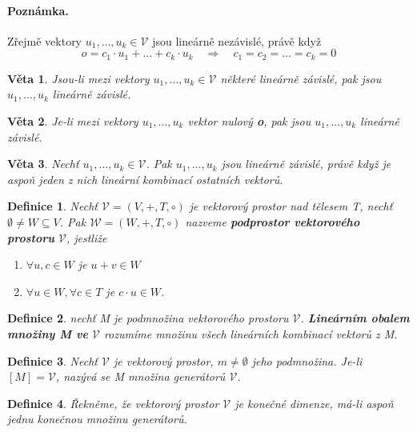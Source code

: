 \documentclass[12pt,a4paper]{article}
\newtheorem{definition}{Definice}
\newtheorem{sentence}{Věta}
\begin{document}
\paragraph{Poznámka.} Zřejmě vektory  $u_1, \dots, u_k \in \mathscr{V}$ jsou lineárně nezávislé, právě když $$o = c_1 \cdot u_1 +  \dots + c_k \cdot u_k \quad \Rightarrow \quad c_1 = c_2 = \dots = c_k = 0$$

\begin{sentence}
	Jsou-li mezi vektory  $u_1, \dots, u_k \in \mathscr{V}$  některé lineárně závislé, pak jsou  $u_1, \dots, u_k$ lineárně závislé.
\end{sentence}

\begin{sentence}
	Je-li mezi vektory  $u_1, \dots, u_k$  vektor nulový \textbf{o}, pak jsou $u_1, \dots, u_k$ lineárně závislé.
\end{sentence}

\begin{sentence}
	Nechť $u_1, \dots, u_k \in \mathscr{V}$. Pak  $u_1, \dots, u_k$ jsou lineárně závislé, právě když je aspoň jeden z nich lineární kombinací ostatních vektorů.
\end{sentence}

\begin{definition}
	Nechť  $\mathscr{V} = (V, +, T, \circ)$  je vektorový prostor nad tělesem T, nechť $\emptyset \not= W \subseteq V$. Pak  $\mathscr{W} = (W, +, T, \circ)$ nazveme \textbf{podprostor vektorového prostoru} $\mathscr{V}$, jestliže
	\begin{enumerate}
		\item $\forall u,c \in W$ je $u + v \in W$
		\item $\forall u \in W, \forall c \in T$ je $c \cdot u \in W$.
	\end{enumerate}
\end{definition}


\begin{definition}
	nechť M je podmnožina vektorového prostoru $\mathscr{V}$. \textbf{Lineárním obalem množiny M ve} $\mathscr{V}$ rozumíme množinu všech lineárních kombinací vektorů z M.
\end{definition}

\begin{definition}
	Nechť  $\mathscr{V}$ je vektorový prostor, $m \not= \emptyset$ jeho podmnožina. Je-li $[M] =\mathscr{V}$, nazývá se M množina generátorů  $\mathscr{V}$.
\end{definition}

\begin{definition}
	Řekněme, že vektorový prostor $\mathscr{V}$ je konečné dimenze, má-li aspoň jednu konečnou množinu generátorů.
\end{definition}
\end{document}
